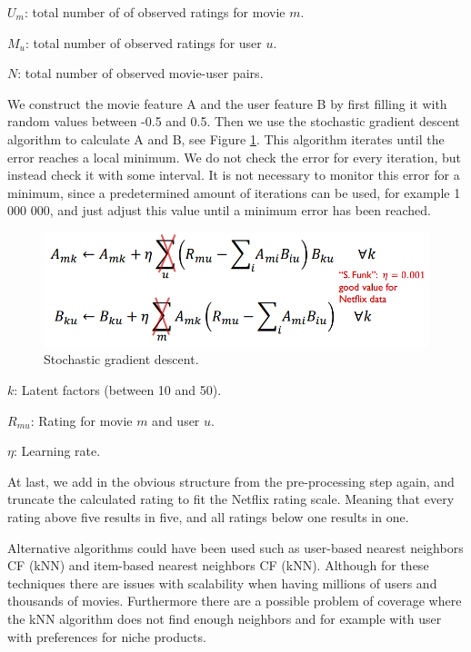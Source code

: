 	\begin{description}
		\item $U_m$: total number of of observed ratings for movie $m$.
		\item $M_u$: total number of observed ratings for user $u$.
		\item $N$: total number of observed movie-user pairs.
	\end{description}	
	
	We construct the movie feature A and the user feature B	by first filling it with random values between -0.5 and 0.5. Then we use the stochastic gradient descent algorithm to calculate A and B, see Figure \ref{fig:stocalg}. This algorithm iterates until the error reaches a local minimum. We do not check the error for every iteration, but instead check it with some interval. It is not necessary to monitor this error for a minimum, since a predetermined amount of iterations can be used, for example 1 000 000, and just adjust this value until a minimum error has been reached.
	
	\begin{figure}[h]
			\centering
			\includegraphics[scale=0.5]{sfunk}
			\caption{Stochastic gradient descent.}\label{fig:stocalg}
	\end{figure}
	
	\begin{description}
		\item $k$: Latent factors (between 10 and 50).
		\item $R_{mu}$: Rating for movie $m$ and user $u$.
		\item $\eta$: Learning rate.
	\end{description}
	
	At last, we add in the obvious structure from the pre-processing step again, and truncate the calculated rating to fit the Netflix rating scale. Meaning that every rating above five results in five, and all ratings below one results in one.
	
	Alternative algorithms could have been used such as user-based nearest neighbors CF (kNN) and item-based nearest neighbors CF (kNN). Although for these techniques there are issues with scalability when having millions of users and thousands of movies. Furthermore there are a possible problem of coverage where the kNN algorithm does not find enough neighbors and for example with user with preferences for niche products.
	

